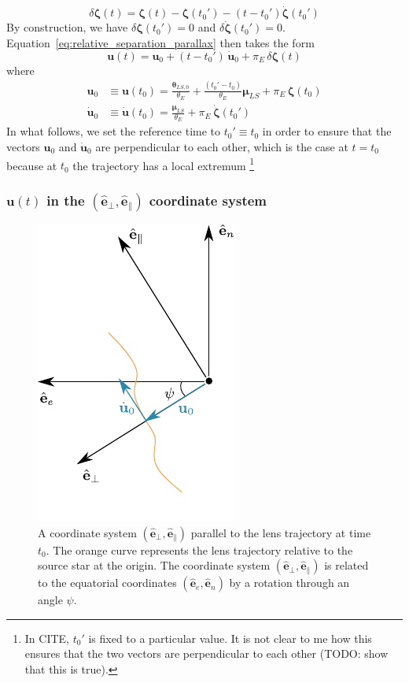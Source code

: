 \documentclass[11pt]{report}
\begin{document}
\begin{equation}
    \delta\boldsymbol \zeta (t)=\boldsymbol \zeta (t)-\boldsymbol \zeta (t_0')-(t-t_0')
    \boldsymbol{\dot \zeta} (t_0')
\end{equation}
By construction, we have $\delta\boldsymbol \zeta (t_0')=0$ and
$\delta\dot{\boldsymbol \zeta} (t_0')=0$.
Equation~\ref{eq:relative_separation_parallax} then takes the form
\begin{equation}
    \boldsymbol{u}(t)=\mathbf{u}_0 + (t-t_0')\,\dot{\mathbf{u}}_0 +
    \pi_E\,\delta\boldsymbol \zeta(t)
    \label{eq:relative_separation_parallax_decomposed}
\end{equation}
where
\begin{align}
    \mathbf{u}_0       & \equiv \mathbf{u}(t_0) =\frac{\boldsymbol\theta_{LS, 0}}{\theta_E}
    + \frac{(t_0'-t_0)}{\theta_E}\boldsymbol\mu_{LS}+
    \pi_E\,\boldsymbol \zeta(t_0)                                                           \\
    \dot{\mathbf{u}}_0 & \equiv\dot{\mathbf{u}}(t_0)=
    \frac{\boldsymbol\mu_{LS}}{\theta_E}  + \pi_E\,\dot{\boldsymbol \zeta}
    (t_0')
\end{align}
In what follows, we set the reference time to $t_0'\equiv t_0$ in order to ensure that
the vectors $\mathbf{u}_0$ and $\dot{\mathbf{u}}_0$ are perpendicular to each other,
which is the case at $t=t_0$ because at $t_0$ the trajectory has a local extremum
\footnote{In CITE, $t_0'$ is fixed to a particular value. It is not clear
    to me how this ensures that the two vectors are perpendicular to each other
    (TODO: show that this is true).}

\subsubsection{$\mathbf{u}(t)$ in the $(\mathbf{\hat e}_\bot,
        \mathbf{\hat e}_\parallel)$ coordinate system}%

\begin{figure}
    \centering
    \includegraphics[width=0.3\linewidth]{static/microlensing/microlensing_parallax_coordinates.pdf}
    \caption{A coordinate system
        $(\mathbf{\hat e}_\bot,\mathbf{\hat e}_\parallel)$ parallel to the lens trajectory at time $t_0$. The orange curve
        represents the lens trajectory relative to the source star at the origin. The
        coordinate system $(\mathbf{\hat e}_\bot,\mathbf{\hat e}_\parallel)$ is related to the equatorial coordinates $(\mathbf{\hat
                e}_e,\mathbf{\hat e}_n)$ by a rotation through an angle $\psi$.}
    \label{fig:parallax2}
\end{figure}
\end{document}
